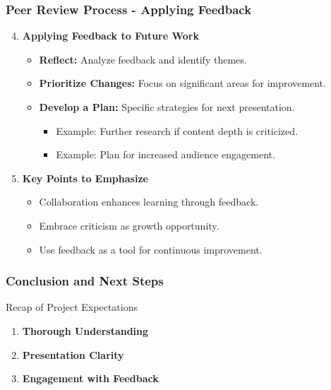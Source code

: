\documentclass{beamer}
\begin{document}
\begin{frame}[fragile]
    \frametitle{Peer Review Process - Applying Feedback}
    \begin{enumerate}
        \setcounter{enumi}{3} %
        \item \textbf{Applying Feedback to Future Work}
        \begin{itemize}
            \item \textbf{Reflect:} Analyze feedback and identify themes.
            \item \textbf{Prioritize Changes:} Focus on significant areas for improvement.
            \item \textbf{Develop a Plan:} Specific strategies for next presentation. 
                \begin{itemize}
                    \item Example: Further research if content depth is criticized.
                    \item Example: Plan for increased audience engagement.
                \end{itemize}
        \end{itemize}
        
        \item \textbf{Key Points to Emphasize}
        \begin{itemize}
            \item Collaboration enhances learning through feedback.
            \item Embrace criticism as growth opportunity.
            \item Use feedback as a tool for continuous improvement.
        \end{itemize}
    \end{enumerate}
\end{frame}

\begin{frame}[fragile]
    \frametitle{Conclusion and Next Steps}
    \begin{block}{Recap of Project Expectations}
        \begin{enumerate}
            \item \textbf{Thorough Understanding}
            \item \textbf{Presentation Clarity}
            \item \textbf{Engagement with Feedback}
        \end{enumerate}
    \end{block}
\end{frame}
\end{document}
